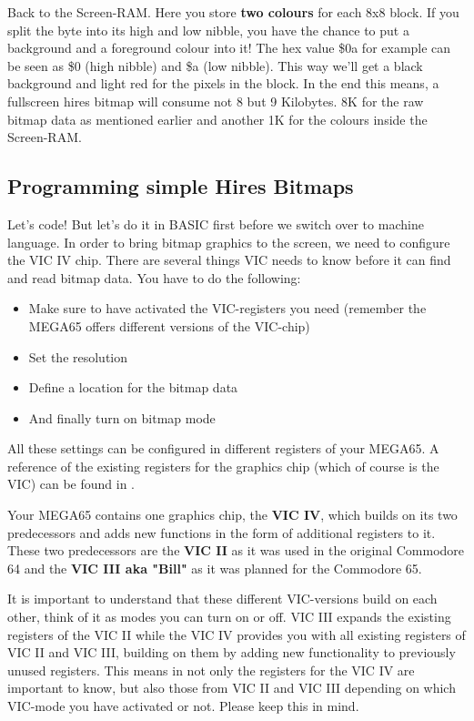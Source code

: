 Back to the Screen-RAM. Here you store \textbf{two colours} for each 8x8 block. If you split the byte into its high and low nibble, you have the chance to put a background and a foreground colour into it! The hex value \$0a for example can be seen as \$0 (high nibble) and \$a (low nibble). This way we'll get a black background and light red for the pixels in the block. In the end this means, a fullscreen hires bitmap will consume not 8 but 9 Kilobytes. 8K for the raw bitmap data as mentioned earlier and another 1K for the colours inside the Screen-RAM.\\

\subsection*{Programming simple Hires Bitmaps}

Let's code! But let's do it in BASIC first before we switch over to machine language. In order to bring bitmap graphics to the screen, we need to configure the VIC IV chip. There are several things VIC needs to know before it can find and read bitmap data. You have to do the following:

\begin{itemize}
	\item Make sure to have activated the VIC-registers you need (remember the MEGA65 offers different versions of the VIC-chip)
	\item Set the resolution
	\item Define a location for the bitmap data 
	\item And finally turn on bitmap mode
\end{itemize}

All these settings can be configured in different registers of your MEGA65. A reference of the existing registers for the graphics chip (which of course is the VIC) can be found in . 

Your MEGA65 contains one graphics chip, the \textbf{VIC IV}, which builds on its two predecessors and adds new functions in the form of additional registers to it. These two predecessors are the \textbf{VIC II} as it was used in the original Commodore 64 and the \textbf{VIC III aka "Bill"} as it was planned for the Commodore 65. 

It is important to understand that these different VIC-versions build on each other, think of it as modes you can turn on or off.
VIC III expands the existing registers of the VIC II while the VIC IV provides you with all existing registers of VIC II and VIC III, building on them by adding new functionality to previously unused registers. This means in  not only the registers for the VIC IV are important to know, but also those from VIC II and VIC III depending on which VIC-mode you have activated or not. Please keep this in mind.

